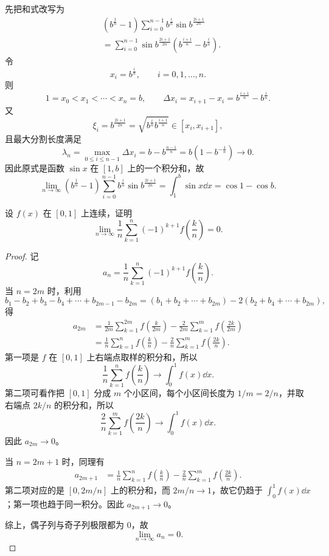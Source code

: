 \begin{solution}
	先把和式改写为
	\[
	\begin{aligned}
		&\left(b^{\frac1n}-1\right)
		\sum_{i=0}^{n-1}b^{\frac{i}{n}}\sin b^{\frac{2i+1}{2n}}  \\
		&=\sum_{i=0}^{n-1}\sin b^{\frac{2i+1}{2n}}
		\left(b^{\frac{i+1}{n}}-b^{\frac{i}{n}}\right).
	\end{aligned}
	\]
	令
	\[
	x_i=b^{\frac{i}{n}},\qquad i=0,1,\ldots,n.
	\]
	则
	\[
	1=x_0<x_1<\cdots <x_n=b,
	\qquad \Delta x_i=x_{i+1}-x_i=b^{\frac{i+1}{n}}-b^{\frac{i}{n}}.
	\]
	又
	\[
	\xi_i=b^{\frac{2i+1}{2n}}=\sqrt{b^{\frac{i}{n}}b^{\frac{i+1}{n}}}\in[x_i,x_{i+1}],
	\]
	且最大分割长度满足
	\[
	\lambda_n=\max_{0\leq i\leq n-1}\Delta x_i
	=b-b^{\frac{n-1}{n}}=b\left(1-b^{-\frac1n}\right)\to 0.
	\]
	因此原式是函数 $\sin x$ 在 $[1,b]$ 上的一个积分和，故
	\[
	\lim_{n\to\infty}\left(b^{\frac1n}-1\right)
	\sum_{i=0}^{n-1}b^{\frac{i}{n}}\sin b^{\frac{2i+1}{2n} }
	=\int_1^b\sin x\dd x=\cos 1-\cos b.
	\]
\end{solution}

\begin{problem}
	设 $f(x)$ 在 $[0,1]$ 上连续，证明
	\[
	\lim_{n\to\infty}\frac1n\sum_{k=1}^n(-1)^{k+1}f\left(\frac{k}{n}\right)=0.
	\]
\end{problem}

\begin{proof}
	记
	\[
	a_n=\frac1n\sum_{k=1}^n(-1)^{k+1}f\left(\frac{k}{n}\right).
	\]
	当 $n=2m$ 时，利用
	\[
	b_1-b_2+b_3-b_4+\cdots+b_{2m-1}-b_{2m}
	=(b_1+b_2+\cdots+b_{2m})-2(b_2+b_4+\cdots+b_{2m}),
	\]
	得
	\[
	\begin{aligned}
		a_{2m}
		&=\frac1{2m}\sum_{k=1}^{2m}f\left(\frac{k}{2m}\right)
		-\frac{2}{2m}\sum_{k=1}^{m}f\left(\frac{2k}{2m}\right)\\
		&=\frac1n\sum_{k=1}^{n}f\left(\frac{k}{n}\right)
		-\frac2n\sum_{k=1}^{m}f\left(\frac{2k}{n}\right).
	\end{aligned}
	\]
	第一项是 $f$ 在 $[0,1]$ 上右端点取样的积分和，所以
	\[
	\frac1n\sum_{k=1}^{n}f\left(\frac{k}{n}\right)\to \int_0^1 f(x)\dd x.
	\]
	第二项可看作把 $[0,1]$ 分成 $m$ 个小区间，每个小区间长度为 $1/m=2/n$，并取右端点 $2k/n$ 的积分和，所以
	\[
	\frac2n\sum_{k=1}^{m}f\left(\frac{2k}{n}\right)\to \int_0^1 f(x)\dd x.
	\]
	因此 $a_{2m}\to 0$。
	
	当 $n=2m+1$ 时，同理有
	\[
	\begin{aligned}
		a_{2m+1}
		&=\frac1n\sum_{k=1}^{n}f\left(\frac{k}{n}\right)
		-\frac2n\sum_{k=1}^{m}f\left(\frac{2k}{n}\right).
	\end{aligned}
	\]
	第二项对应的是 $[0,2m/n]$ 上的积分和，而 $2m/n\to 1$，故它仍趋于 $\int_0^1f(x)\dd x$；第一项也趋于同一积分。因此 $a_{2m+1}\to0$。
	
	综上，偶子列与奇子列极限都为 $0$，故
	\[
	\lim_{n\to\infty}a_n=0.
	\]
\end{proof}

